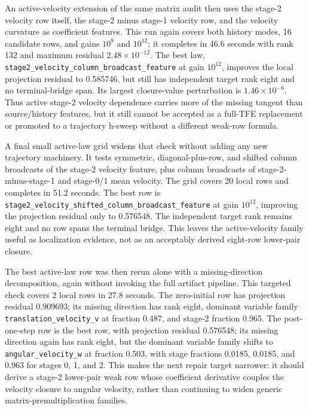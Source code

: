 \documentclass[11pt]{article}
\newcommand{\tfe}{TFE}
\begin{document}
An active-velocity extension of the same matrix audit then uses the stage-2
velocity row itself, the stage-2 minus stage-1 velocity row, and the velocity
curvature as coefficient features.  This run again covers both history modes,
16 candidate rows, and gains $10^8$ and $10^{12}$; it completes in 46.6
seconds with rank 132 and maximum residual $2.48\times10^{-12}$.  The best
law, \nolinkurl{stage2_velocity_column_broadcast_feature} at gain
$10^{12}$, improves the local projection residual to 0.585746, but still has
independent target rank eight and no terminal-bridge span.  Its largest
closure-value perturbation is $1.46\times10^{-6}$.  Thus active stage-2
velocity dependence carries more of the missing tangent than source/history
features, but it still cannot be accepted as a full-\tfe{} replacement or
promoted to a trajectory h-sweep without a different weak-row formula.

A final small active-law grid widens that check without adding any new
trajectory machinery.  It tests symmetric, diagonal-plus-row, and shifted
column broadcasts of the stage-2 velocity feature, plus column broadcasts of
stage-2-minus-stage-1 and stage-0/1 mean velocity.  The grid covers 20 local
rows and completes in 51.2 seconds.  The best row is
\nolinkurl{stage2_velocity_shifted_column_broadcast_feature} at gain
$10^{12}$, improving the projection residual only to 0.576548.  The
independent target rank remains eight and no row spans the terminal bridge.
This leaves the active-velocity family useful as localization evidence, not as
an acceptably derived eight-row lower-pair closure.

The best active-law row was then rerun alone with a missing-direction
decomposition, again without invoking the full artifact pipeline.  This
targeted check covers 2 local rows in 27.8 seconds.  The zero-initial row has
projection residual 0.909693; its missing direction has rank eight, dominant
variable family \nolinkurl{translation_velocity_v} at fraction 0.487, and
stage-2 fraction 0.965.  The post-one-step row is the best row, with
projection residual 0.576548; its missing direction again has rank eight, but
the dominant variable family shifts to \nolinkurl{angular_velocity_w} at
fraction 0.503, with stage fractions 0.0185, 0.0185, and 0.963 for stages 0,
1, and 2.  This makes the next repair target narrower: it should derive a
stage-2 lower-pair weak row whose coefficient derivative couples the velocity
closure to angular velocity, rather than continuing to widen generic
matrix-premultiplication families.
\end{document}
